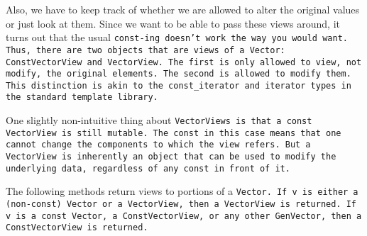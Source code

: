 Also, we have to 
keep track of whether we are allowed to alter the original values or
just look at them.  
Since we want to be able to pass these views around, it turns out that
the usual \tt{const}-ing doesn't work the way you would want.
Thus, there are two objects that are views of a
\tt{Vector}:
\tt{ConstVectorView} and \tt{VectorView}.  
The first is only allowed to view,
not modify, the original elements.  The second is allowed to modify them.
This distinction is akin to the \tt{const\_iterator} and \tt{iterator} types in the
standard template library.

One slightly non-intuitive thing about \tt{VectorView}s is that a 
\tt{const VectorView} is still mutable.  The \tt{const} in this case
means that one cannot change the components to which the view refers.
But a \tt{VectorView} is inherently an object that can be used to 
modify the underlying data, regardless of any \tt{const} in front of it.

The following methods return views to portions of a \tt{Vector}.
If \tt{v} is either a (non-\tt{const}) \tt{Vector}
or a \tt{VectorView}, then a \tt{VectorView} is returned.
If \tt{v} is a \tt{const Vector}, a \tt{ConstVectorView}, or any other \tt{GenVector},
then a \tt{ConstVectorView} is returned.  

